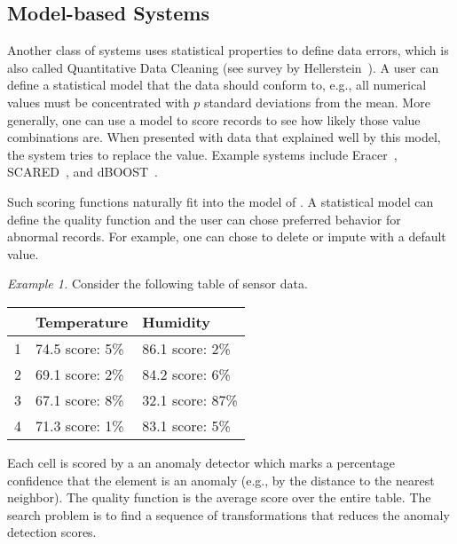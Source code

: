 \subsection{Model-based Systems}
Another class of systems uses statistical properties to define data errors, which is also called Quantitative Data Cleaning (see survey by Hellerstein~\cite{hellerstein2008quantitative}).
A user can define a statistical model that the data should conform to, e.g., all numerical values must be concentrated with $p$ standard deviations from the mean. 
More generally, one can use a model to score records to see how likely those value combinations are.
When presented with data that explained well by this model, the system tries to replace the value.
Example systems include Eracer~\cite{eracer}, SCARED~\cite{yakout2013don}, and dBOOST~\cite{pit2016outlier}.

Such scoring functions naturally fit into the model of \sys.
A statistical model can define the quality function and the user can chose preferred behavior for abnormal records.
For example, one can chose to delete or impute with a default value.

\vspace{0.5em} \noindent \emph{Example 1.} Consider the following table of sensor data.
\begin{table}[ht!]
\centering
\label{my-label}
\begin{tabular}{|l|l|l|}
\hline
\rowcolor[HTML]{000000} 
  & {\color[HTML]{FFFFFF} Temperature}            & {\color[HTML]{FFFFFF} Humidity}   \\ \hline
1 & 74.5 {\color[HTML]{00FE00}score: 5\%}                                 & 86.1 {\color[HTML]{00FE00}score: 2\%}                                  \\ \hline
2 & 69.1  {\color[HTML]{00FE00} score: 2\%}                                   & 84.2 {\color[HTML]{00FE00}score: 6\%}                               \\ \hline
3 & 67.1   {\color[HTML]{00FE00}score: 8\%}                                 & 32.1  {\color[HTML]{FE0000}score: 87\%}                                \\ \hline
4 & 71.3  {\color[HTML]{00FE00}score: 1\%}                              & 83.1  {\color[HTML]{00FE00}score: 5\%}                                \\ \hline
\end{tabular}
\end{table}

Each cell is scored by a an anomaly detector which marks a percentage confidence that the element is an anomaly (e.g., by the distance to the nearest neighbor). The quality function is the average score over the entire table.
The search problem is to find a sequence of transformations that reduces the anomaly detection scores.


